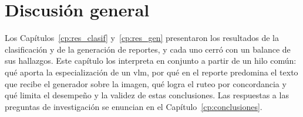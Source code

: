 \chapter[Discusión]{Discusión general}
\label{cp:discusion}
%

Los Capítulos~\ref{cp:res_clasif} y~\ref{cp:res_gen} presentaron los resultados de la clasificación y de la
generación de reportes, y cada uno cerró con un balance de sus hallazgos. Este capítulo los interpreta en conjunto a
partir de un hilo común: qué aporta la especialización de un \gls{vlm}, por qué en el reporte predomina el texto que
recibe el generador sobre la imagen, qué logra el ruteo por concordancia y qué limita el desempeño y la validez de estas
conclusiones. Las respuestas a las preguntas de investigación se enuncian en el Capítulo~\ref{cp:conclusiones}.






